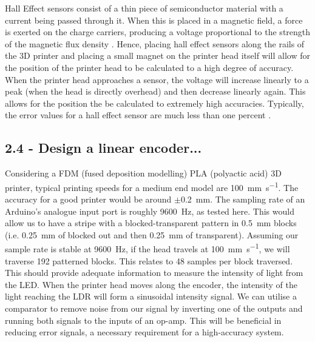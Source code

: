 \documentclass[conference]{IEEEtran}
\begin{document}
Hall Effect sensors consist of a thin piece of semiconductor material with a current being passed through it. When this is placed in a magnetic field, a force is exerted on the charge carriers, producing a voltage proportional to the strength of the magnetic flux density \cite{b3}. Hence, placing hall effect sensors along the rails of the 3D printer and placing a small magnet on the printer head itself will allow for the position of the printer head to be calculated to a high degree of accuracy. When the printer head approaches a sensor, the voltage will increase linearly to a peak (when the head is directly overhead) and then decrease linearly again. This allows for the position the be calculated to extremely high accuracies. Typically, the error values for a hall effect sensor are much less than one percent \cite{b4}.

\subsection*{2.4 - Design a linear encoder...}
Considering a FDM (fused deposition modelling) PLA (polyactic acid) 3D printer, typical printing speeds \cite{b1} for a medium end model are \SI{100}{\milli\meter\per\second}. The accuracy for a good printer would be around $\pm$\SI{0.2}{\milli\meter}. The sampling rate of an Arduino's analogue input port is roughly \SI{9600}{\hertz}, as tested here. This would allow us to have a stripe with a blocked-transparent pattern in \SI{0.5}{\milli\meter} blocks (i.e. \SI{0.25}{\milli\meter} of blocked out and then \SI{0.25}{\milli\meter} of transparent). Assuming our sample rate is stable at \SI{9600}{\hertz}, if the head travels at \SI{100}{\milli\meter\per\second}, we will traverse 192 patterned blocks. This relates to 48 samples per block traversed. This should provide adequate information to measure the intensity of light from the LED. When the printer head moves along the encoder, the intensity of the light reaching the LDR will form a sinusoidal intensity signal. We can utilise a comparator to remove noise from our signal by inverting one of the outputs and running both signals to the inputs of an op-amp. This will be beneficial in reducing error signals, a necessary requirement for a high-accuracy system. 
\end{document}
